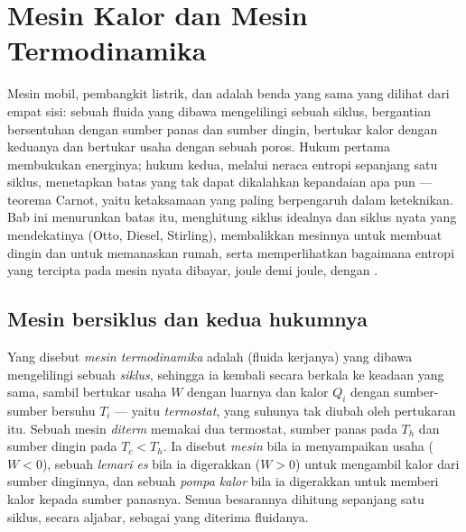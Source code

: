 \chapter{Mesin Kalor dan Mesin Termodinamika}\label{ch:b1:heat-engines}

Mesin mobil, pembangkit listrik,  dan  adalah
benda yang sama yang dilihat dari empat sisi: sebuah fluida yang dibawa mengelilingi
sebuah siklus, bergantian bersentuhan dengan sumber panas dan sumber dingin,
bertukar kalor dengan keduanya dan bertukar usaha dengan sebuah poros. Hukum
pertama membukukan energinya; hukum kedua, melalui neraca entropi sepanjang satu
siklus, menetapkan batas yang tak dapat dikalahkan kepandaian apa pun ---
teorema Carnot, yaitu ketaksamaan yang paling berpengaruh dalam keteknikan. Bab
ini menurunkan batas itu, menghitung siklus idealnya dan siklus nyata yang
mendekatinya (Otto, Diesel, Stirling), membalikkan mesinnya untuk membuat dingin
dan untuk memanaskan rumah, serta memperlihatkan bagaimana entropi yang tercipta
pada mesin nyata dibayar, joule demi joule, dengan .

\section{Mesin bersiklus dan kedua hukumnya}

\begin{definition}\label{def:b1:heat-engines:machine}
Yang disebut \emph{mesin termodinamika} adalah  (fluida kerjanya)
yang dibawa mengelilingi sebuah \emph{siklus}, sehingga ia kembali secara berkala ke keadaan
yang sama, sambil bertukar usaha $W$ dengan luarnya dan kalor $Q_i$ dengan
sumber-sumber bersuhu $T_i$ --- yaitu \emph{termostat}, yang suhunya
tak diubah oleh pertukaran itu. Sebuah mesin \emph{diterm} memakai dua
termostat, sumber panas pada $T_h$ dan sumber dingin pada $T_c < T_h$.
Ia disebut \emph{mesin} bila ia menyampaikan usaha ($W < 0$), sebuah
\emph{lemari es} bila ia digerakkan ($W > 0$) untuk mengambil kalor dari sumber
dinginnya, dan sebuah \emph{pompa kalor} bila ia digerakkan untuk memberi kalor kepada sumber panasnya.
Semua besarannya dihitung sepanjang satu siklus, secara aljabar, sebagai yang diterima
fluidanya.
\end{definition}

